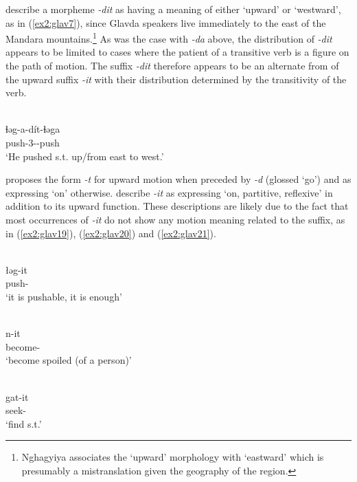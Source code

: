 \citet[662]{bubaGlavdaMorphology2007} describe a morpheme \textit{-dit} as having a meaning of either ‘upward’ or ‘westward’, as in (\ref{ex2:glav7}), since Glavda speakers live immediately to the east of the Mandara mountains.\footnote{Nghagyiya associates the ‘upward’ morphology with ‘eastward’ which is presumably a mistranslation given the geography of the region.} As was the case with \textit{-da} above, the distribution of \textit{-dit} appears to be limited to cases where the patient of a transitive verb is a figure on the path of motion. The suffix \textit{-dit} therefore appears to be an alternate from of the upward suffix \textit{-it} with their distribution determined by the transitivity of the verb.

\ea\label{ex2:glav7}
 \\
\gll ɬəg-a-dít-ɬəga \\
push-3--push \\
\glt `He pushed s.t. up/from east to west.'
\z

\citet[26]{nghagyiyaSketchGlavdaGrammar2011} proposes the form \textit{-t} for upward motion when preceded by \textit{-d} (glossed `go') and as expressing `on' otherwise. \citet[662]{bubaGlavdaMorphology2007} describe \textit{-it} as expressing `on, partitive, reflexive' in addition to its upward function. These descriptions are likely due to the fact that most occurrences of \textit{-it} do not show any motion meaning related to the suffix, as in (\ref{ex2:glav19}), (\ref{ex2:glav20}) and (\ref{ex2:glav21}).

\ea\label{ex2:glav19}
 \\
\gll łəg-it	\\
push-	\\
\glt `it is pushable, it is enough'

\ex\label{ex2:glav20}
 \\
\gll n-it	\\
become- \\
\glt `become spoiled (of a person)'

\ex\label{ex2:glav21}
 \\
\gll gat-it	\\
seek- \\
\glt `find s.t.'
\z 

